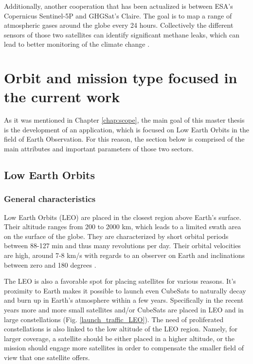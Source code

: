 Additionally, another cooperation that has been actualized is between ESA's Copernicus Sentinel-5P and GHGSat’s Claire. The goal is to map a range of atmospheric gases around the globe every 24 hours. Collectively the different sensors of those two satellites can identify significant methane leaks, which can lead to better monitoring of the climate change \cite{cooperation}. %


\bigskip
\section{Orbit and mission type focused in the current work}
\bigskip

As it was mentioned in Chapter \ref{chap:scope}, the main goal of this master thesis is the development of an application, which is focused on Low Earth Orbits in the field of Earth Observation. For this reason, the section below is comprised of the main attributes and important parameters of those two sectors.

\bigskip
\subsection{Low Earth Orbits}
\bigskip

\subsubsection{General characteristics}
\bigskip
Low Earth Orbits (LEO) are placed in the closest region above Earth's surface. Their altitude ranges from 200 to 2000 km, which leads to a limited swath area on the surface of the globe. They are characterized by short orbital periods between 88-127 min and thus many revolutions per day. Their orbital velocities are high, around 7-8 km/s with regards to an observer on Earth and inclinations between zero and 180 degrees \cite{Campbell}.

The LEO is also a favorable spot for placing satellites for various reasons. It's proximity to Earth makes it possible to launch even CubeSats to naturally decay and burn up in Earth's atmosphere within a few years. Specifically in the recent years more and more small satellites and/or CubeSats are placed in LEO and in large constellations (Fig. \ref{launch_traffic_LEO}). The need of proliferated constellations is also linked to the low altitude of the LEO region. Namely, for larger coverage, a satellite should be either placed in a higher altitude, or the mission should engage more satellites in order to compensate the smaller field of view that one satellite offers.


